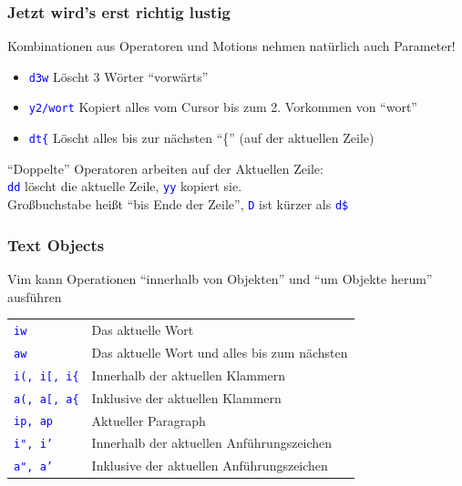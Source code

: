 \documentclass{beamer}
\newcommand{\cmd}[1]{\textcolor{blue}{\texttt{#1}}}
\begin{document}
\begin{frame}
  \frametitle{Jetzt wird's erst richtig lustig}
  Kombinationen aus Operatoren und Motions nehmen natürlich auch Parameter! \\[0.3cm]

  \begin{itemize}
    \item \cmd{d3w} Löscht 3 Wörter \enquote{vorwärts} \\[0.3cm]
    \item \cmd{y2/wort} Kopiert alles vom Cursor bis zum 2. Vorkommen von \enquote{wort} \\[0.3cm]
    \item \cmd{dt\{} Löscht alles bis zur nächsten \enquote{\{} (auf der aktuellen Zeile) \\[0.5cm]
  \end{itemize}

  \enquote{Doppelte} Operatoren arbeiten auf der Aktuellen Zeile: \\
  \cmd{dd} löscht die aktuelle Zeile, \cmd{yy} kopiert sie. \\[0.3cm]

  Großbuchstabe heißt \enquote{bis Ende der Zeile}, \cmd{D} ist kürzer als \cmd{d\$}
\end{frame}

\begin{frame}
  \frametitle{Text Objects}
  Vim kann Operationen \enquote{innerhalb von Objekten} und \enquote{um Objekte herum} ausführen  \\[0.5cm]

  \begin{tabular}{l | l}
    \cmd{iw} & Das aktuelle Wort \\[0.2cm]
    \cmd{aw} & Das aktuelle Wort und alles bis zum nächsten \\[0.2cm]
    \cmd{i(, i[, i\{} & Innerhalb der aktuellen Klammern \\[0.2cm]
    \cmd{a(, a[, a\{} & Inklusive der aktuellen Klammern \\[0.2cm]
    \cmd{ip, ap} & Aktueller Paragraph \\[0.2cm]
    \cmd{i", i'} & Innerhalb der aktuellen Anführungszeichen \\[0.2cm]
    \cmd{a", a'} & Inklusive der aktuellen Anführungszeichen
  \end{tabular}
\end{frame}
\end{document}
